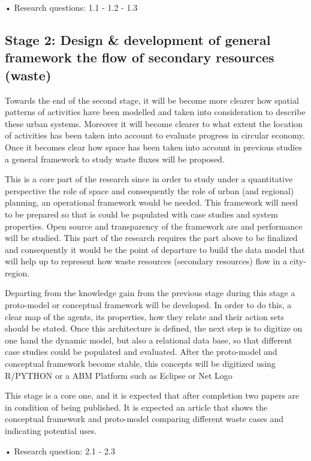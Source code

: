 •	Research questions: 1.1 - 1.2 - 1.3    


\subsection{Stage 2: Design \& development of general framework the flow of secondary resources (waste)}
Towards the end of the second stage, it will be become more clearer how spatial patterns of activities have been modelled and taken into consideration to describe these urban systems. Moreover it will become clearer to what extent the location of activities has been taken into account to evaluate progress in circular economy.
Once it becomes clear how space has been taken into account in previous studies a general framework to study waste fluxes will be proposed.\par
This is a core part of the research since in order to study under a quantitative perspective the role of space and consequently the role of urban (and regional) planning, an operational framework would be needed. This framework will need to be prepared so that is could be populated with case studies and system properties. Open source and transparency of the framework are and performance will be studied. This part of the research requires the part above to be finalized and consequently it would be the point of departure to build the data model that will help up to represent how waste resources (secondary resources) flow in a city-region.\par
Departing from the knowledge gain from the previous stage during this stage a proto-model or conceptual framework will be developed. In order to do this, a clear map of the agents, its properties, how they relate and their action sets should be stated. Once this architecture is defined, the next step is to digitize on one hand the dynamic model, but also a relational data base, so that different case studies could be populated and evaluated. After the proto-model and conceptual framework become stable, this concepts will be digitized using R/PYTHON or a ABM Platform such as Eclipse or Net Logo\par
This stage is a core one, and it is expected that after completion two papers are in condition of being published. It is expected an article that shows the conceptual framework and proto-model comparing different waste cases and indicating potential uses. \par
•	Research question: 2.1 - 2.3 \par


